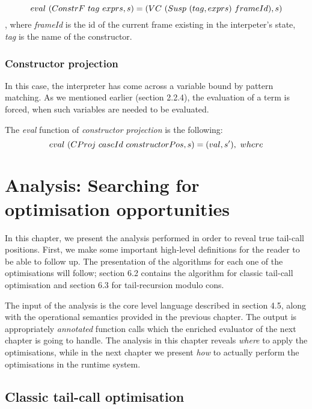\documentclass[diploma]{softlab-thesis}
\begin{document}
\[eval \hfill\ (ConstrF \hfill\ tag \hfill\ exprs, s) = (VC \hfill\ (Susp \hfill\ (tag, exprs) \hfill\ frameId), s) \]
, where \textit{frameId} is the id of the current frame existing in the interpeter's state, 
\textit{tag} is the name of the constructor.

\subsection{Constructor projection}

In this case, the interpreter has come across a variable bound by 
pattern matching. As we mentioned earlier (section 2.2.4), the evaluation 
of a term is forced, when such variables are needed to be evaluated.

The \textit{eval} function of \textit{constructor projection} is the following:
\[eval \hfill\ (CProj \hfill\ caseId \hfill\ constructorPos, s) = (val, s'),
\hfill\ where \]

\chapter{Analysis: Searching for optimisation opportunities}

In this chapter, we present the analysis performed in order to reveal true tail-call positions.
First, we make some important high-level definitions for the reader to be able to follow up. 
The presentation of the algorithms for each one of the optimisations will follow; section 6.2 contains 
the algorithm for classic tail-call optimisation and section 6.3 for tail-recursion modulo cons.
\newline
\par The input of the analysis is the core level language described in section 4.5, 
along with the operational semantics provided in the previous chapter. The output is appropriately 
\textit{annotated} function calls which the enriched evaluator of the next chapter is going to handle.
The analysis in this chapter reveals \textit{where} to apply the optimisations, while 
in the next chapter we present \textit{how} to actually perform the optimisations in the runtime system.




\section{Classic tail-call optimisation}
\end{document}
